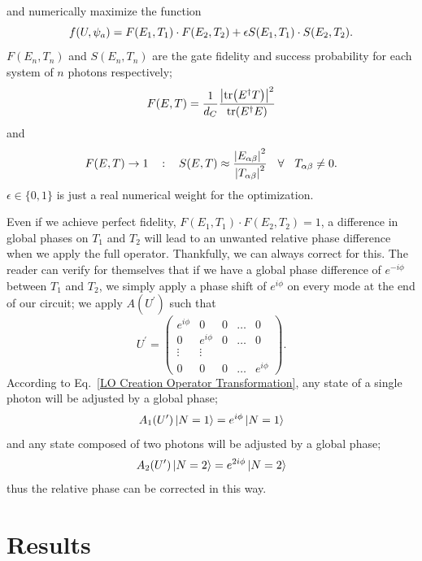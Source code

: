 \documentclass[aps,pra,twocolumn,showpacs,superscriptaddress,floatfix,10pt]{revtex4}
\begin{document}
and numerically maximize the function
\begin{equation}
\label{Merit Function For Blocks}
\small f(U,\psi_a) = F(E_1,T_1) \cdot F(E_2,T_2) +\epsilon S(E_1,T_1) \cdot S(E_2,T_2).
\end{equation}
$F(E_n,T_n)$ and $S(E_n,T_n)$ are the gate fidelity and success probability for each system of $n$ photons respectively;
\begin{equation}
	\label{Gate Fidelity}
		F(E,T) = \frac{1}{d_C} \frac{\abs{\tr(E^\dagger T)}^2}{\tr(E^\dagger E)} 
\end{equation}
and
\begin{equation}
\label{Success Probability} 
\small	F(E,T) \rightarrow 1 \quad : \quad S(E,T) \approx \frac{\abs{E_{\alpha \beta}}^2}{\abs{T_{\alpha \beta}}^2} \quad \forall \quad T_{\alpha \beta } \ne 0.
\end{equation}
$\epsilon \in \{0,1\}$ is just a real numerical weight for the optimization.

Even if we achieve perfect fidelity, $F(E_1,T_1) \cdot F(E_2,T_2) = 1$, a difference in global phases on $T_1$ and $T_2$ will lead to an unwanted relative phase difference when we apply the full operator. Thankfully, we can always correct for this. The reader can verify for themselves that if we have a global phase difference of $e^{-i \phi}$ between $T_1$ and $T_2$, we simply apply a phase shift of $e^{i \phi}$ on every mode at the end of our circuit; we apply $A(U^\prime)$ such that
\begin{equation}
U^\prime = \begin{pmatrix}
e^{i \phi} & 0 & 0 & \dots & 0 \\
0 & e^{i \phi} & 0 & \dots & 0 \\
\vdots & \vdots \\
0 & 0 & 0 & \dots & e^{i \phi}
\end{pmatrix}.
\end{equation}
According to Eq.~\ref{LO Creation Operator Transformation}, any state of a single photon will be adjusted by a global phase;
\begin{equation}
A_1(U^\prime) \ket{N=1} = e^{i \phi } \ket{N=1}
\end{equation}
and any state composed of two photons will be adjusted by a global phase;
\begin{equation}
A_2(U^\prime) \ket{N=2} = e^{2 i \phi} \ket{N=2}
\end{equation}
thus the relative phase can be corrected in this way.
\section{Results}
\end{document}
